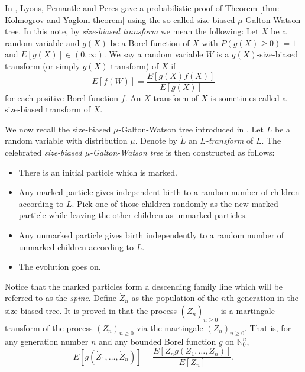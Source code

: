\documentclass[12pt,a4paper]{amsart}
\numberwithin{equation}{section}
\begin{document}
	In \cite{lyons1995conceptual}, Lyons, Pemantle and Peres gave a probabilistic proof of Theorem \ref{thm: Kolmogrov and Yaglom theorem} using the so-called size-biased $\mu$-Galton-Watson tree.
	In this note, by \emph{size-biased transform} we mean the following:
	Let $X$ be a random variable
	and $g(X)$ be a Borel function of $X$ with $P(g(X) \geq 0) = 1$ and $E[g(X)]\in (0,\infty)$.
	We say a random variable
	$W$ is
	a $g(X)$-size-biased transform (or simply $g(X)$-transform) of $X$ if
\[
	E[f( W )] 
	= \frac{ E[g(X)f(X)]}{E[g(X)]}
\]
	for each positive Borel function $f$.
	An $X$-transform of $X$ is sometimes called a size-biased transform of $X$.

	We now recall the size-biased $\mu$-Galton-Watson tree introduced in \cite{lyons1995conceptual}.
	Let $L$ be a random variable with distribution $\mu$.
   Denote by $\dot L$ an \emph{$L$-transform} of $L$.
	The celebrated \emph{size-biased $\mu$-Galton-Watson tree} is then constructed as follows:
\begin{itemize}
\item
	There is an initial particle which is marked.
\item
	Any marked particle gives independent birth to a random number of children according to $\dot L$. Pick one of those children randomly as the new marked particle while leaving the other children as unmarked particles.
\item
	Any unmarked particle gives 
birth independently to a random number of unmarked children according to $L$.
\item
	The evolution goes on.
\end{itemize}

	Notice that the marked particles form a descending family line which will be referred to as the \emph{spine}.
	Define $\dot Z_n$ as the population of the $n$th generation in the size-biased tree.
	It is proved in \cite{lyons1995conceptual} that the process $(\dot Z_n)_{n\ge 0}$ is a martingale transform of the process $(Z_n)_{n\ge 0}$ via the martingale $(Z_n)_{n\ge 0}.$
	That is, for any generation number $n$ and any bounded Borel function $g$ on $\mathbb N_0^{n}$,
\begin{equation}
\label{eq:htransformation}
	E [ g ( \dot Z_1, \dots, \dot Z_n) ]
	= \frac { E[ Z_n g( Z_1, \dots, Z_n)]} {E [ Z_n]}.
\end{equation}
\end{document}
